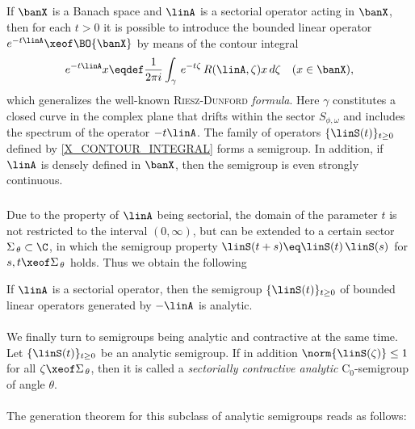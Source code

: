 \documentclass[11pt,twoside]{article}
\begin{document}
\subparagraph{}
If $\banX$ is a Banach space
and $\linA$ is a sectorial operator acting in $\banX$,
then for each $t > 0$
it is possible to introduce the bounded linear operator
$e^{-t \linA} \xeof \BO{\banX}$ by means of the contour integral
\begin{equation}\label{X_CONTOUR_INTEGRAL}
e^{-t \linA} x \eqdef
\frac{1}{2 \pi i}
\int_{\gamma} \, e^{-t \zeta} \, R(\linA,\zeta)x \, d\zeta
\quad (x \in \banX),
\end{equation}
which generalizes the well-known \textsc{Riesz-Dunford} \textit{formula}.
Here $\gamma$ constitutes a closed curve in the complex plane
that drifts within the sector $S_{\phi,\omega}$
and includes the spectrum of the operator $-t \linA$.
The family of operators $\{\linS(t)\}_{t \geq 0}$
defined by \eqref{X_CONTOUR_INTEGRAL} forms a semigroup.
In addition,
if $\linA$ is densely defined in $\banX$,
then the semigroup is even strongly continuous.

\subparagraph{}
Due to the property of $\linA$ being sectorial,
the domain of the parameter $t$ is not restricted
to the interval $(0,\infty)$,
but can be extended to a certain sector $\Sigma_{\,\theta} \subset \C$,
in which the semigroup property
$\linS(t+s) \eq \linS(t)\,\linS(s)$ for $s,t \xeof \Sigma_{\,\theta}$ holds.
Thus we obtain the following

\begin{theorem1}\label{X_SEMIGROUP_CREATED_BY_SECTORIAL_OPERATOR_IS_ANALYTIC}
If $\linA$ is a sectorial operator,
then the semigroup $\{\linS(t)\}_{t \geq 0}$ of bounded linear operators
generated by $- \linA$ is {analytic}.
\end{theorem1}

\paragraph{} %
We finally turn to semigroups being analytic and contractive at the same time.
Let $\{\linS(t)\}_{t \geq 0}$ be an analytic semigroup.
If in addition $\norm{\linS(\zeta)} \leq 1$
for all $\zeta \xeof \Sigma_{\,\theta}$,
then it is called a \textit{sectorially contractive analytic}
C$_0$-semigroup of angle $\theta$.

\paragraph{}
The generation theorem for this subclass of analytic semigroups
reads as follows:
\end{document}
